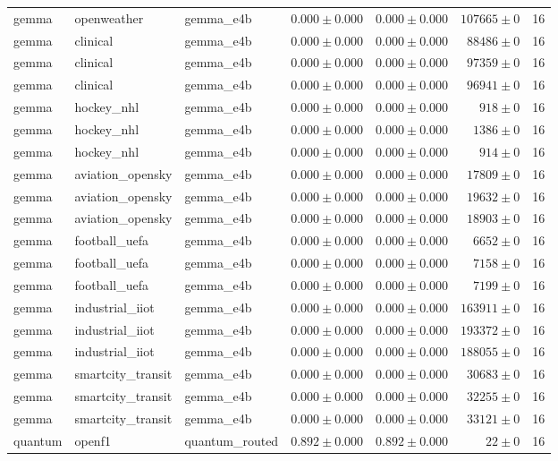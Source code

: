 \begin{table}[htbp]
\begin{tabular}{l l l r r r r}
gemma & openweather & gemma\_e4b & $0.000\pm0.000$ & $0.000\pm0.000$ & $107665\pm0$ & 16 \\
gemma & clinical & gemma\_e4b & $0.000\pm0.000$ & $0.000\pm0.000$ & $88486\pm0$ & 16 \\
gemma & clinical & gemma\_e4b & $0.000\pm0.000$ & $0.000\pm0.000$ & $97359\pm0$ & 16 \\
gemma & clinical & gemma\_e4b & $0.000\pm0.000$ & $0.000\pm0.000$ & $96941\pm0$ & 16 \\
gemma & hockey\_nhl & gemma\_e4b & $0.000\pm0.000$ & $0.000\pm0.000$ & $918\pm0$ & 16 \\
gemma & hockey\_nhl & gemma\_e4b & $0.000\pm0.000$ & $0.000\pm0.000$ & $1386\pm0$ & 16 \\
gemma & hockey\_nhl & gemma\_e4b & $0.000\pm0.000$ & $0.000\pm0.000$ & $914\pm0$ & 16 \\
gemma & aviation\_opensky & gemma\_e4b & $0.000\pm0.000$ & $0.000\pm0.000$ & $17809\pm0$ & 16 \\
gemma & aviation\_opensky & gemma\_e4b & $0.000\pm0.000$ & $0.000\pm0.000$ & $19632\pm0$ & 16 \\
gemma & aviation\_opensky & gemma\_e4b & $0.000\pm0.000$ & $0.000\pm0.000$ & $18903\pm0$ & 16 \\
gemma & football\_uefa & gemma\_e4b & $0.000\pm0.000$ & $0.000\pm0.000$ & $6652\pm0$ & 16 \\
gemma & football\_uefa & gemma\_e4b & $0.000\pm0.000$ & $0.000\pm0.000$ & $7158\pm0$ & 16 \\
gemma & football\_uefa & gemma\_e4b & $0.000\pm0.000$ & $0.000\pm0.000$ & $7199\pm0$ & 16 \\
gemma & industrial\_iiot & gemma\_e4b & $0.000\pm0.000$ & $0.000\pm0.000$ & $163911\pm0$ & 16 \\
gemma & industrial\_iiot & gemma\_e4b & $0.000\pm0.000$ & $0.000\pm0.000$ & $193372\pm0$ & 16 \\
gemma & industrial\_iiot & gemma\_e4b & $0.000\pm0.000$ & $0.000\pm0.000$ & $188055\pm0$ & 16 \\
gemma & smartcity\_transit & gemma\_e4b & $0.000\pm0.000$ & $0.000\pm0.000$ & $30683\pm0$ & 16 \\
gemma & smartcity\_transit & gemma\_e4b & $0.000\pm0.000$ & $0.000\pm0.000$ & $32255\pm0$ & 16 \\
gemma & smartcity\_transit & gemma\_e4b & $0.000\pm0.000$ & $0.000\pm0.000$ & $33121\pm0$ & 16 \\
quantum & openf1 & quantum\_routed & $0.892\pm0.000$ & $0.892\pm0.000$ & $22\pm0$ & 16 \\

\end{tabular}
\end{table}
